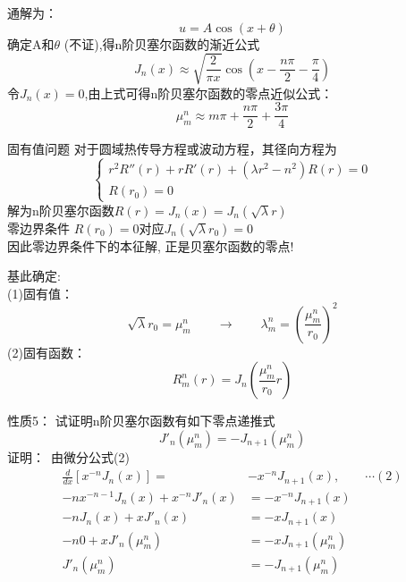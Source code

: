 	通解为：\[u=A\cos(x+\theta)\]
	确定A和$\theta$ (不证),得n阶贝塞尔函数的渐近公式\\
	\begin{equation*}
		J_{n}(x) \approx \sqrt{\frac{2}{\pi x}} \cos \left(x-\frac{n \pi}{2}-\frac{\pi}{4}\right)
	\end{equation*}
	令$J_{n}(x)=0$,由上式可得n阶贝塞尔函数的零点近似公式：
	\begin{equation*}
		\mu_{m}^{n} \approx m \pi+\frac{n \pi}{2}+\frac{3 \pi}{4}
	\end{equation*}




	{固有值问题}
	对于圆域热传导方程或波动方程，其径向方程为
	\[\begin{cases}
		r^2 R'' (r)+r R'(r) +( \lambda r^2 -n^2)R(r)=0  \\
		R(r_0)=0
	\end{cases}  \]
	解为n阶贝塞尔函数$R(r)=J_n(x) = J_n(\sqrt{\lambda}r)$ \\ \vspace*{2em}
	{\Bullet} 零边界条件 $R(r_0)=0$对应$J_n(\sqrt{\lambda}r_0)=0$\\ 
	因此零边界条件下的本征解, 正是贝塞尔函数的零点!



	基此确定:\\	
	(1)固有值：
	\[ \sqrt{\lambda}r_0 = \mu_{m}^{n}  \qquad \to \qquad \lambda_m ^n =(\frac{\mu_{m}^{n}}{r_0})^2 \]
	(2)固有函数：\[R_m ^n(r) = J_n (\frac{\mu_{m}^{n}}{r_0}r) \]



	{}
	{\alert{性质5：}} 试证明n阶贝塞尔函数有如下零点递推式
	\[ J'_n(\mu_m ^n)= - J_{n+1}(\mu_m ^n)\]
	{\alert{证明：}}~由微分公式(2) 
 	\begin{equation*}
	\begin{split}
	 \frac{d}{d x}\left[x^{-n} J_{n}(x)\right]=& -x^{-n} J_{n+1}(x) ,\qquad \cdots (2) \\
	 -n x^{-n-1} J_n(x) + x^{-n} J'_n(x)&= -x^{-n} J_{n+1}(x) \\
	 -n J_n(x) + x J'_n(x)&= -x J_{n+1}(x) \\
	 -n 0 + x J'_n(\mu_m ^n)&= -x J_{n+1}(\mu_m ^n) \\
	 J'_n(\mu_m ^n)&= - J_{n+1}(\mu_m ^n)
 	\end{split}
	\end{equation*}	



